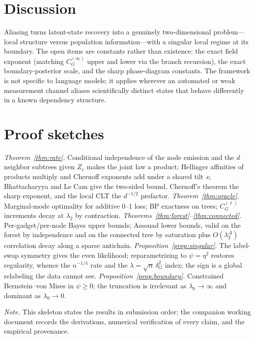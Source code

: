 \documentclass[11pt]{article}
\theoremstyle{plain}
\theoremstyle{definition}\newtheorem{definition}{Definition}\newtheorem{assumption}{Assumption}
\begin{document}
\section{Discussion}
Aliasing turns latent-state recovery into a genuinely two-dimensional problem---local structure versus population
information---with a singular local regime at its boundary. The open items are constants rather than existence:
the exact field exponent (matching $C_G^{(\infty)}$ upper and lower via the branch recursion), the exact
boundary-posterior scale, and the sharp phase-diagram constants. The framework is not specific to language models;
it applies wherever an automated or weak measurement channel aliases scientifically distinct states that behave
differently in a known dependency structure.

\appendix
\section{Proof sketches}
\emph{Theorem~\ref{thm:rate}.} Conditional independence of the node emission and the $d$ neighbor subtrees given
$Z_v$ makes the joint law a product; Hellinger affinities of products multiply and Chernoff exponents add under a
shared tilt $s$; Bhattacharyya and Le Cam give the two-sided bound, Chernoff's theorem the sharp exponent, and the
local CLT the $d^{-1/2}$ prefactor.\quad
\emph{Theorem~\ref{thm:oracle}.} Marginal-mode optimality for additive $0$--$1$ loss; BP exactness on trees;
$C_G^{(\ell)}$ increments decay at $\lambda_2$ by contraction.\quad
\emph{Theorems~\ref{thm:forest}--\ref{thm:connected}.} Per-gadget/per-node Bayes upper bounds; Assouad lower
bounds, valid on the forest by independence and on the connected tree by saturation plus $O(\lambda_2^\Delta)$
correlation decay along a sparse antichain.\quad
\emph{Proposition~\ref{prop:singular}.} The label-swap symmetry gives the even likelihood; reparametrizing to
$\psi=\eta^2$ restores regularity, whence the $n^{-1/4}$ rate and the $\lambda=\sqrt n\,\delta_G^2$ index; the sign
is a global relabeling the data cannot see.\quad
\emph{Proposition~\ref{prop:boundary}.} Constrained Bernstein--von Mises in $\psi\ge0$; the truncation is
irrelevant as $\lambda_0\to\infty$ and dominant as $\lambda_0\to0$.

\smallskip\noindent\footnotesize\emph{Note.} This skeleton states the results in submission order; the companion
working document records the derivations, numerical verification of every claim, and the empirical provenance.
\normalsize
\end{document}

